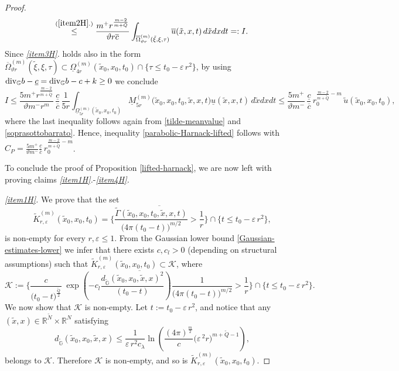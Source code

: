 \documentclass[11pt,a4paper]{article}
\numberwithin{equation}{section}
\def \rn {{\mathbb {R}}^{N}}
\def \rnm {{\mathbb {R}}^{\tilde N}}
\def \tt {\tilde}
\def \GG {{\mathbb{G}}}
\def \div {{\text{\rm div}}}
\def \ti {\times}
\def \e {{\varepsilon}}
\def \l {{\lambda}}
\def \t {{\tau}}
\def \x {{\xi}}
\def \O {{\Omega}}
\begin{document}
{{\begin{proof}
\begin{equation}
\begin{aligned}
			&\;\;\overset{(\ref{item2H}.)}\leq\frac{m^+ r^{\frac{m-2}{m+\tt Q}} }{\vartheta r \overline{c}} \int_{\overline\Omega_{\vartheta r}^{(m)}(\tt\x,\x,\t)}  \overline u(\tt x, x,t) \, d\tt x  d x dt =: I.
		\end{aligned}
	\end{equation}
	Since \emph{\ref{item3H}.} holds also in the form $\overline\Omega_{\vartheta r}^{(m)}(\tt \x,\x, \t)\subset \underline \O^{(m)}_{4 r}(\tt x_0, x_0, t_0)\cap \big\{\t\leq t_0 \!-\!\e\, r^2\big\}$,  by using $\div_{\GG} b - \underline{c} =\div_{\GG} b-c+k\geq 0$ we conclude
	\begin{equation}
		I\leq \frac{5m^+r^{\frac{m-2}{m+\tt Q}}}{\vartheta m^-r^m }\,\frac{\underline{c}}{\overline{c}}\,\frac{1}{5 r } \int_{\underline \O^{(m)}_{5r }(\tt x_0, x_0, t_0)} \!\!\!\!\!\!\!\!\!\!\!\!\!\!\!\!\!\!\!\!\underline M_{5r}^{(m)}\big(\tt x_0, x_0,t_0,\tt x, x,t\big) \underline u(\tt x, x,t) \, d\tt x d x dt \leq \frac{5m^+}{\vartheta m^-} \,\frac{\underline{c}}{\overline{c}}\, r_0^{\frac{m-2}{m+\tt Q}-m} \,\tt u(\tt x_0, x_0,t_0),
	\end{equation}
	where the last inequality follows again from \eqref{tilde-meanvalue} and \eqref{soprasottobarrato}.  Hence, inequality \eqref{parabolic-Harnack-lifted} follows with $C_P = \frac{5m^+}{\vartheta m^-} \frac{\underline{c}}{\overline{c}}\, r_0^{\frac{m-2}{m+\tt Q}-m}$. 
	
	\medskip
	
	To conclude the proof of Proposition \ref{lifted-harnack}, we are now left with proving claims \emph{\ref{item1H}.}-\emph{\ref{item4H}.}
	
	
	\medskip
	\emph{\ref{item1H}.} We prove that the set 
	\begin{equation}
		\tt K_{r,\e}^{(m)}(\tt x_0, x_0, t_0)=\overline{\biggl\{\frac{\tt \Gamma(\tt x_0, x_0, t_0,\tt x, x,t)}{\big( 4\pi(t_0-t)\big)^{m/2}}  >\frac{1}{r} \biggr\}}\cap \Big\{t\leq t_0 - \e\, r^2\Big\},
	\end{equation}
 	is non-empty for every $r,\e\leq 1$. From the Gaussian lower bound \eqref{Gaussian-estimates-lower} we infer that there exists $c,c_l>0$ (depending on structural assumptions) such that $\tt K_{r,\e}^{(m)}(\tt x_0, x_0, t_0)\subset \mathcal K$, where
	\begin{equation}
		\mathcal K:=\overline{\Biggl\{\frac{c}{\big (t_0-t\big)^{\frac{\tt Q}{2}}} \;\exp{\left(-c_l\frac{d_{\tt\GG}(\tt x_0, x_0,\tt x, x)^2}{(t_0-t)}\right)}\frac{1}{\big( 4\pi(t_0-t)\big)^{m/2}}  >\frac{1}{r} \Biggr\}}\cap \Big\{t\leq t_0 - \e\,r^2\Big\}. 
	\end{equation}
	We now show that $\mathcal K$ is non-empty. Let $t:=t_0-\e\,r^2$, and notice that any $(\tt x, x)\in \rnm\ti\rn$ satisfying
	\begin{equation}
		d_{\tt\GG}(\tt x_0, x_0,\tt x, x)\leq \frac{1}{\e\,r^2c_\l}\ln\left(\frac{(4\pi)^\frac{m}{2}}{c}\big(\e\,^2r\big)^{m+\tt Q-1}\right),
	\end{equation}
	belongs to $\mathcal K$. Therefore $\mathcal K$ is non-empty, and so is $\tt K_{r,\e}^{(m)}(\tt x_0, x_0, t_0)$.
	

\end{proof}}}
\end{document}
